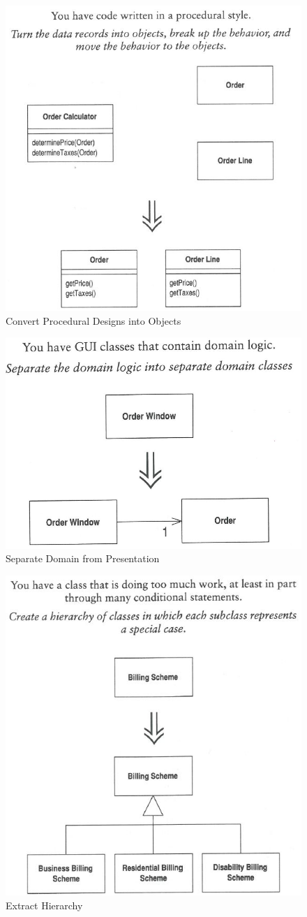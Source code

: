 \begin{figure}[h!]
\centering
\includegraphics[width=0.7\linewidth]{fig/proc-to-object}
\caption{Convert Procedural Designs into Objects}
\label{fig:proc-to-object}
\end{figure}

\begin{figure}[h!]
\centering
\includegraphics[width=0.7\linewidth]{fig/separate-domain-from-presentation}
\caption{Separate Domain from Presentation}
\label{fig:separate-domain-from-presentation}
\end{figure}

\begin{figure}[h!]
\centering
\includegraphics[width=0.7\linewidth]{fig/extract-hierarchy}
\caption{Extract Hierarchy}
\label{fig:extract-hierarchy}
\end{figure}









